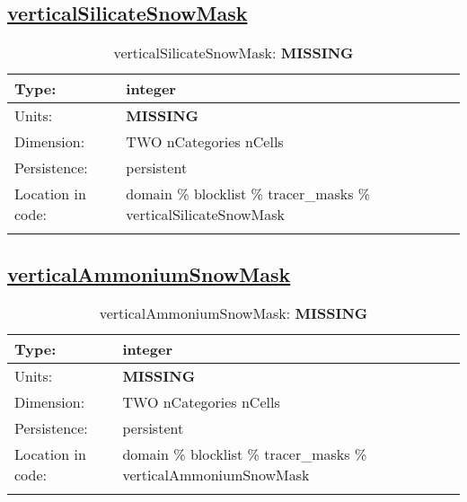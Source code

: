\subsection[verticalSilicateSnowMask]{\hyperref[sec:var_tab_tracer_masks]{verticalSilicateSnowMask}}
\label{subsec:var_sec_tracer_masks_verticalSilicateSnowMask}
\begin{center}
\begin{longtable}{| p{2.0in} | p{4.0in} |}
        \hline 
        Type: & integer \\
        \hline 
        Units: & {\bf \color{red} MISSING} \\
        \hline 
        Dimension: & TWO nCategories nCells \\
        \hline 
        Persistence: & persistent \\
        \hline 
         Location in code: & domain \% blocklist \% tracer\_masks \% verticalSilicateSnowMask \\
         \hline 
    \caption{verticalSilicateSnowMask: {\bf \color{red} MISSING}}
\end{longtable}
\end{center}
\subsection[verticalAmmoniumSnowMask]{\hyperref[sec:var_tab_tracer_masks]{verticalAmmoniumSnowMask}}
\label{subsec:var_sec_tracer_masks_verticalAmmoniumSnowMask}
\begin{center}
\begin{longtable}{| p{2.0in} | p{4.0in} |}
        \hline 
        Type: & integer \\
        \hline 
        Units: & {\bf \color{red} MISSING} \\
        \hline 
        Dimension: & TWO nCategories nCells \\
        \hline 
        Persistence: & persistent \\
        \hline 
         Location in code: & domain \% blocklist \% tracer\_masks \% verticalAmmoniumSnowMask \\
         \hline 
    \caption{verticalAmmoniumSnowMask: {\bf \color{red} MISSING}}
\end{longtable}
\end{center}
